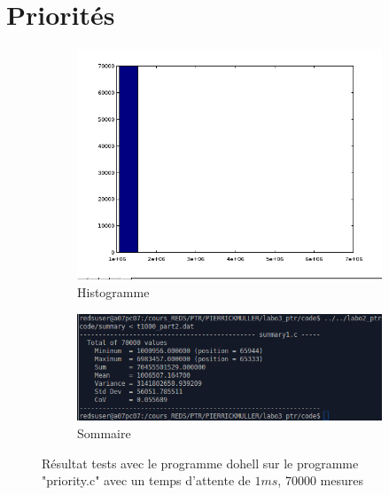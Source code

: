 \section{Priorités}


\par
\begin{figure}[H]
\begin{subfigure}{.5\textwidth}
  \centering
  \includegraphics[width=.9\linewidth]{./img/part2_octave.png}
  \caption*{Histogramme}

\end{subfigure}%
\begin{subfigure}{.5\textwidth}
  \centering
  \includegraphics[width=.9\linewidth]{./img/part2_summary.png}
  \caption*{Sommaire}

\end{subfigure}
\caption{Résultat tests avec le programme dohell sur le programme "priority.c" avec un temps d'attente de $1ms$, 70000 mesures }

\end{figure}